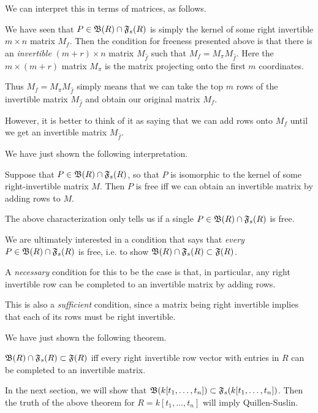 We can interpret this in terms of matrices, as follows.

We have seen that $P \in \mathfrak B(R) \cap \mathfrak{F}_s(R)$ is simply the kernel of some right invertible $m \times n$ matrix $M_f$.
Then the condition for freeness presented above is that there is an \emph{invertible} $(m+r) \times n$ matrix $M_{\hat f}$ such that $M_f = M_\pi M_{\hat f}$.
Here the $m \times (m+r)$ matrix $M_\pi$ is the matrix projecting onto the first $m$ coordinates.

Thus $M_f = M_\pi M_{\hat f}$ simply means that we can take the top $m$ rows of the invertible matrix $M_{\hat f}$ and obtain our original matrix $M_f$.

However, it is better to think of it as saying that we can add rows onto $M_f$ until we get an invertible matrix $M_{\hat f}$.

We have just shown the following interpretation.

\begin{proposition}
  Suppose that $P \in \mathfrak B(R) \cap \mathfrak{F}_s(R)$, so that $P$ is isomorphic to the kernel of some right-invertible matrix $M$.
  Then $P$ is free iff we can obtain an invertible matrix by adding rows to $M$.
\end{proposition}

The above characterization only tells us if a single $P \in \mathfrak B(R) \cap \mathfrak{F}_s(R)$ is free.

We are ultimately interested in a condition that says that \emph{every} $P \in \mathfrak B(R) \cap \mathfrak{F}_s(R)$ is free, i.e. to show $\mathfrak B(R) \cap \mathfrak{F}_s(R) \subset \mathfrak F(R)$.

A \emph{necessary} condition for this to be the case is that, in particular, any right invertible row can be completed to an invertible matrix by adding rows.

This is also a \emph{sufficient} condition, since a matrix being right invertible implies that each of its rows must be right invertible.

We have just shown the following theorem.

\begin{theorem}
\label{thm:quillensuslin_ringcondition}
  $\mathfrak B(R) \cap \mathfrak{F}_s(R) \subset \mathfrak F(R)$ iff every right invertible row vector with entries in $R$ can be completed to an invertible matrix.
\end{theorem}

In the next section, we will show that $\mathfrak B(k[t_1, \dots, t_n]) \subset \mathfrak{F}_s(k[t_1, \dots, t_n])$.
Then the truth of the above theorem for $R=k[t_1,\dots,t_n]$ will imply Quillen-Suslin.

